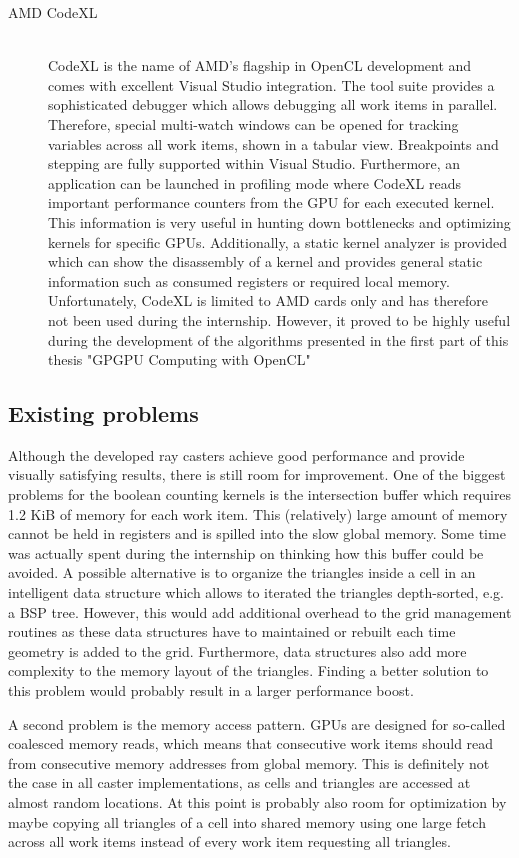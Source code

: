\begin{description}
\item[AMD CodeXL] \hfill \\
CodeXL is the name of AMD's flagship in OpenCL development and comes with excellent Visual Studio integration. The tool suite provides a sophisticated debugger which allows debugging all work items in parallel. Therefore, special multi-watch windows can be opened for tracking variables across all work items, shown in a tabular view. Breakpoints and stepping are fully supported within Visual Studio. Furthermore, an application can be launched in profiling mode where CodeXL reads important performance counters from the GPU for each executed kernel. This information is very useful in hunting down bottlenecks and optimizing kernels for specific GPUs. Additionally, a static kernel analyzer is provided which can show the disassembly of a kernel and provides general static information such as consumed registers or required local memory. Unfortunately, CodeXL is limited to AMD cards only and has therefore not been used during the internship. However, it proved to be highly useful during the development of the algorithms presented in the first part of this thesis "GPGPU Computing with OpenCL"
\end{description}

\subsection{Existing problems}

Although the developed ray casters achieve good performance and provide visually satisfying results, there is still room for improvement. One of the biggest problems for the boolean counting kernels is the intersection buffer which requires 1.2 KiB of memory for each work item. This (relatively) large amount of memory cannot be held in registers and is spilled into the slow global memory. Some time was actually spent during the internship on thinking how this buffer could be avoided. A possible alternative is to organize the triangles inside a cell in an intelligent data structure which allows to iterated the triangles depth-sorted, e.g. a BSP tree. However, this would add additional overhead to the grid management routines as these data structures have to maintained or rebuilt each time geometry is added to the grid. Furthermore, data structures also add more complexity to the memory layout of the triangles. Finding a better solution to this problem would probably result in a larger performance boost.

A second problem is the memory access pattern. GPUs are designed for so-called coalesced memory reads, which means that consecutive work items should read from consecutive memory addresses from global memory. This is definitely not the case in all caster implementations, as cells and triangles are accessed at almost random locations. At this point is probably also room for optimization by maybe copying all triangles of a cell  into shared memory using one large fetch across all work items instead of every work item requesting all triangles.

